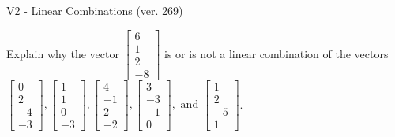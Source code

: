 \begin{exercise}
  \begin{exerciseTitle}V2 - Linear Combinations (ver. 269)\end{exerciseTitle}
  \begin{exerciseStatement}
    Explain why the vector \(\left[\begin{array}{c}
6 \\
1 \\
2 \\
-8
\end{array}\right]\)  is or is not a linear 
	combination of the vectors \(\left[\begin{array}{c}
0 \\
2 \\
-4 \\
-3
\end{array}\right] , \left[\begin{array}{c}
1 \\
1 \\
0 \\
-3
\end{array}\right] , \left[\begin{array}{c}
4 \\
-1 \\
2 \\
-2
\end{array}\right] , \left[\begin{array}{c}
3 \\
-3 \\
-1 \\
0
\end{array}\right] , \text{ and } \left[\begin{array}{c}
1 \\
2 \\
-5 \\
1
\end{array}\right]\).
	



\end{exerciseStatement}
\end{exercise}
